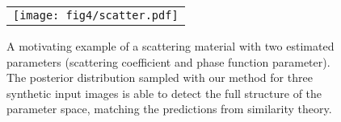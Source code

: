 \begin{figure}[t]
	\centering
	\addtolength{\tabcolsep}{-3pt}
	\begin{tabular}{c}
		\texttt{[image: fig4/scatter.pdf]}
	\end{tabular}
	\captionsetup{labelfont=bf,textfont=it}
	\caption{\label{fig:scatter}
		A motivating example of a scattering material with two estimated parameters (scattering coefficient and phase function parameter). The posterior distribution sampled with our method for three synthetic input images is able to detect the full structure of the parameter space, matching the predictions from similarity theory.
	}
\end{figure}

